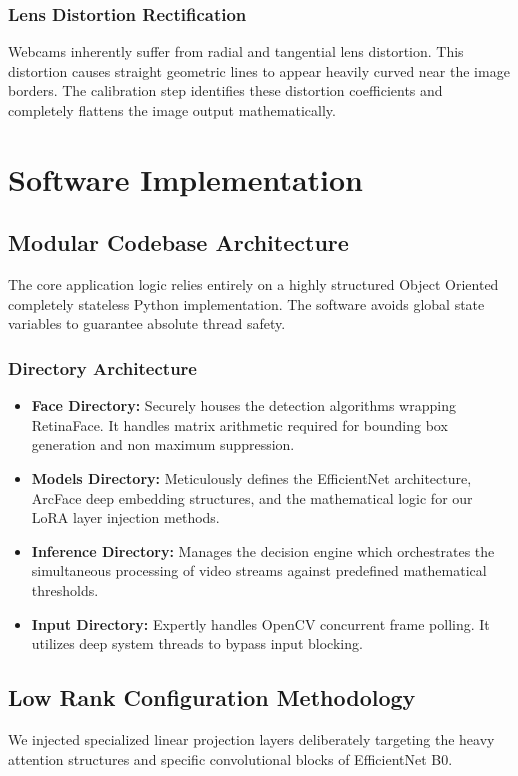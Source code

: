 \documentclass[12pt,a4paper]{report}
\begin{document}
\subsection{Lens Distortion Rectification}
Webcams inherently suffer from radial and tangential lens distortion. This distortion causes straight geometric lines to appear heavily curved near the image borders. The calibration step identifies these distortion coefficients and completely flattens the image output mathematically.


\chapter{Software Implementation}
\section{Modular Codebase Architecture}
The core application logic relies entirely on a highly structured Object Oriented completely stateless Python implementation. The software avoids global state variables to guarantee absolute thread safety.

\subsection{Directory Architecture}
\begin{itemize}
    \item \textbf{Face Directory:} Securely houses the detection algorithms wrapping RetinaFace. It handles matrix arithmetic required for bounding box generation and non maximum suppression.
    \item \textbf{Models Directory:} Meticulously defines the EfficientNet architecture, ArcFace deep embedding structures, and the mathematical logic for our LoRA layer injection methods.
    \item \textbf{Inference Directory:} Manages the decision engine which orchestrates the simultaneous processing of video streams against predefined mathematical thresholds.
    \item \textbf{Input Directory:} Expertly handles OpenCV concurrent frame polling. It utilizes deep system threads to bypass input blocking.
\end{itemize}

\section{Low Rank Configuration Methodology}
We injected specialized linear projection layers deliberately targeting the heavy attention structures and specific convolutional blocks of EfficientNet B0. 
\end{document}
